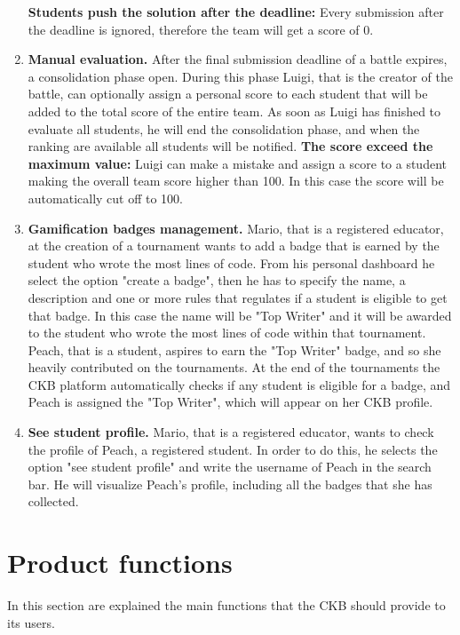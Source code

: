 \begin{enumerate}[label=\textbf{SC.\arabic*}]
    \textbf{Students push the solution after the deadline:} Every submission after the deadline is ignored, therefore the team will get a score of 0. 
    \item {} \textbf{Manual evaluation.} \newline
    After the final submission deadline of a battle expires, a consolidation phase open. During this phase Luigi, that is the creator of the battle, can optionally assign a personal score to each student that will be added to the total score of the entire team.
    As soon as Luigi has finished to evaluate all students, he will end the consolidation phase, and when the ranking are available all students will be notified.\newline
    \textbf{The score exceed the maximum value:} Luigi can make a mistake and assign a score to a student making the overall team score higher than 100. In this case the score will be automatically cut off to 100.
    \item {} \textbf{Gamification badges management.} \newline
    Mario, that is a registered educator, at the creation of a tournament wants to add a badge that is earned by the student who wrote the most lines of code. From his personal dashboard he select the option "create a badge", then he has to specify the name, a description and one or more rules that regulates if a student is eligible to get that badge. In this case the name will be "Top Writer" and it will be awarded to the student who wrote the most lines of code within that tournament. \newline
    Peach, that is a student, aspires to earn the "Top Writer" badge, and so she heavily contributed on the tournaments. At the end of the tournaments the CKB platform automatically checks if any student is eligible for a badge, and Peach is assigned the "Top Writer", which will appear on her CKB profile.
    \item {} \textbf{See student profile.} \newline
    Mario, that is a registered educator, wants to check the profile of Peach, a registered student. In order to do this, he selects the option "see student profile" and write the username of Peach in the search bar. He will visualize Peach's profile, including all the badges that she has collected.
\end{enumerate}

\clearpage

\section{Product functions}\label{desc:prodFunc}
In this section are explained the main functions that the CKB should provide to its users.

